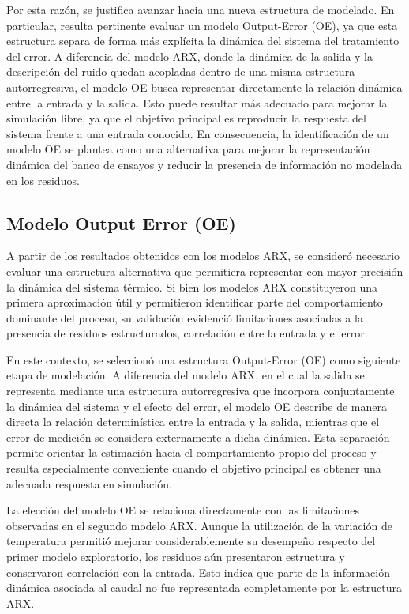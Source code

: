 \documentclass[11pt]{report}
\begin{document}
Por esta razón, se justifica avanzar hacia una nueva estructura de modelado. En particular, resulta pertinente evaluar un modelo Output-Error (OE), ya que esta estructura separa de forma más explícita la dinámica del sistema del tratamiento del error. A diferencia del modelo ARX, donde la dinámica de la salida y la descripción del ruido quedan acopladas dentro de una misma estructura autorregresiva, el modelo OE busca representar directamente la relación dinámica entre la entrada y la salida. Esto puede resultar más adecuado para mejorar la simulación libre, ya que el objetivo principal es reproducir la respuesta del sistema frente a una entrada conocida. En consecuencia, la identificación de un modelo OE se plantea como una alternativa para mejorar la representación dinámica del banco de ensayos y reducir la presencia de información no modelada en los residuos.

\subsection{Modelo Output Error (OE)}

A partir de los resultados obtenidos con los modelos ARX, se consideró necesario evaluar una estructura alternativa que permitiera representar con mayor precisión la dinámica del sistema térmico. Si bien los modelos ARX constituyeron una primera aproximación útil y permitieron identificar parte del comportamiento dominante del proceso, su validación evidenció limitaciones asociadas a la presencia de residuos estructurados, correlación entre la entrada y el error.

En este contexto, se seleccionó una estructura Output-Error (OE) como siguiente etapa de modelación. A diferencia del modelo ARX, en el cual la salida se representa mediante una estructura autorregresiva que incorpora conjuntamente la dinámica del sistema y el efecto del error, el modelo OE describe de manera directa la relación determinística entre la entrada y la salida, mientras que el error de medición se considera externamente a dicha dinámica. Esta separación permite orientar la estimación hacia el comportamiento propio del proceso y resulta especialmente conveniente cuando el objetivo principal es obtener una adecuada respuesta en simulación.

La elección del modelo OE se relaciona directamente con las limitaciones observadas en el segundo modelo ARX. Aunque la utilización de la variación de temperatura permitió mejorar considerablemente su desempeño respecto del primer modelo exploratorio, los residuos aún presentaron estructura y conservaron correlación con la entrada. Esto indica que parte de la información dinámica asociada al caudal no fue representada completamente por la estructura ARX.
\end{document}
